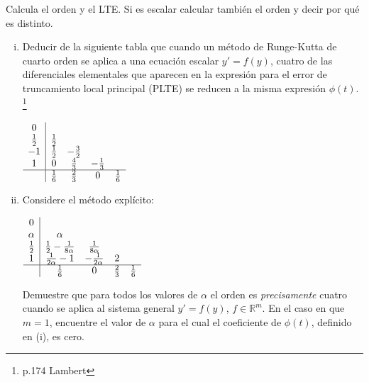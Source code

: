 \begin{ejer}[5.8.3] 
Calcula el orden y el LTE. Si es escalar calcular tambi\'en el orden y decir por qu\'e es distinto.  
\begin{enumerate}[i)]
    \item Deducir de la siguiente tabla que cuando un método de Runge-Kutta de cuarto orden se aplica a una ecuación escalar $y' = f(y)$, cuatro de las diferenciales elementales que aparecen en la expresión para el error de truncamiento local principal (PLTE) se reducen a la misma expresión $\phi(t)$. \footnote{p.174 Lambert}
    \begin{center}
$\begin{array}{c|cccc}
0 & \\
\frac{1}{2} & \frac{1}{2} \\
-1 & \frac{1}{2} & -\frac{3}{2}   \\
1 & 0 & \frac{4}{3} & -\frac{1}{3} \\
\hline
& \frac{1}{6} & \frac{2}{3} & 0 & \frac{1}{6}
\end{array}$
\end{center}
    \item Considere el método explícito:
\begin{center}
$\begin{array}{c|cccc}
0 & \\
\alpha & \alpha & \\
\frac{1}{2} & \frac{1}{2} - \frac{1}{8\alpha} & \frac{1}{8\alpha} &  \\
1 & \frac{1}{2\alpha} - 1 & -\frac{1}{2\alpha} & 2 &  \\
\hline
& \frac{1}{6} & 0 & \frac{2}{3} & \frac{1}{6}
\end{array}$
\end{center}
Demuestre que para todos los valores de $\alpha$ el orden es \emph{precisamente} cuatro cuando se aplica al sistema general $y' = f(y)$, $f \in \mathbb{R}^m$. En el caso en que $m = 1$, encuentre el valor de $\alpha$ para el cual el coeficiente de $\phi(t)$, definido en (i), es cero.
\end{enumerate}
\end{ejer}

